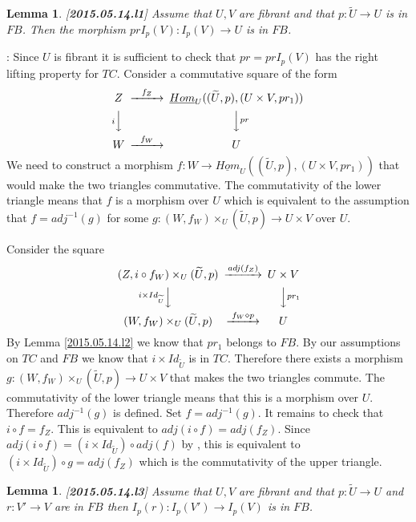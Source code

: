 \documentclass[12pt]{article}
\newenvironment{myproof}{{\bf Proof}:}{\vskip 5mm }
\newtheorem{lemma}[proposition]{Lemma}
\newcommand{\llabel}[1]{\label{#1}[{\bf #1}]}
\newcommand{\sr}{\rightarrow}
\newcommand{\uu}{\underline}
\newcommand{\wt}{\widetilde}
\newcommand{\dd}{\diamond}
\begin{document}
%
\begin{lemma}
\llabel{2015.05.14.l1}
Assume that $U,V$ are fibrant and that $p:\wt{U}\sr U$ is in $FB$. Then the morphism $prI_p(V):I_p(V)\sr U$ is in $FB$.
\end{lemma}
%
\begin{myproof}
Since $U$ is fibrant it is sufficient to check that $pr=prI_p(V)$ has the right lifting property for $TC$. Consider a commutative square of the form
%
$$
\begin{CD}
Z @>f_Z>> \uu{Hom}_U((\wt{U},p),(U\times V,pr_1))\\
@V i VV @VV pr V\\
W @>f_W >> U
\end{CD}
$$
%
We need to construct a morphism $f:W\sr \uu{Hom}_U((\wt{U},p),(U\times V,pr_1))$ that would make the two triangles commutative. The commutativity of the lower triangle means that $f$ is a morphism over $U$ which is equivalent to the assumption that $f=adj^{-1}(g)$ for some $g:(W,f_W)\times_U (\wt{U},p)\sr U\times V$ over $U$.

Consider the square
%
$$
\begin{CD}
(Z, i\circ f_W)\times_U (\wt{U},p) @>adj(f_Z)>> U\times V\\
@V i\times Id_{\wt{U}} VV @VV pr_1 V\\
(W,f_W)\times_U (\wt{U},p) @> f_W\dd p >> U
\end{CD}
$$
%
By Lemma \ref{2015.05.14.l2} we know that $pr_1$ belongs to $FB$. By our assumptions on $TC$ and $FB$ we know that $i\times Id_{\wt{U}}$ is in $TC$. Therefore there exists a morphism  $g:(W,f_W)\times_U (\wt{U},p) \sr U\times V$ that makes the two triangles commute. 
The commutativity of the lower triangle means that this is a morphism over $U$. Therefore $adj^{-1}(g)$ is defined. Set $f=adj^{-1}(g)$. It remains to check that $i\circ f=f_Z$. This is equivalent to $adj(i\circ f)=adj(f_Z)$. Since $adj(i\circ f)=(i\times Id_{\wt{U}})\circ adj(f)$ by \cite[Lemma 8.7(3)]{fromunivwithPi}, this is equivalent to $(i\times Id_{\wt{U}})\circ g=adj(f_Z)$ which is the commutativity of the upper triangle. 
\end{myproof}
%
\begin{lemma}
\llabel{2015.05.14.l3}
Assume that $U,V$ are fibrant and that $p:\wt{U}\sr U$ and $r:V'\sr V$ are in $FB$ then $I_p(r):I_p(V')\sr I_p(V)$ is in $FB$.
\end{lemma}
%
\end{document}
